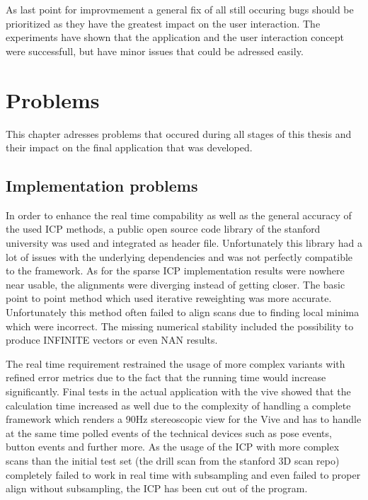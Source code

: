 \documentclass[hyperref,english,bachelorofscience,bibnum,twoside]{cgvpub}
\begin{document}
As last point for improvmement a general fix of all still occuring bugs should be prioritized as they have the greatest impact on the user interaction.
The experiments have shown that the application and the user interaction concept were successfull, but have minor issues that could be adressed easily.

\chapter{Problems}

This chapter adresses problems that occured during all stages of this thesis and their impact on the final application that was developed.

\section{Implementation problems} \label{ch:Problems}

In order to enhance the real time compability as well as the general accuracy of the used ICP methods, a public open source code library of the stanford university was used and integrated as header file. Unfortunately this library had a lot of issues with the underlying dependencies and was not perfectly compatible to the framework. As for the sparse ICP implementation results were nowhere near usable, the alignments were diverging instead of getting closer. The basic point to point method which used iterative reweighting
was more accurate. Unfortunately this method often failed to align scans due to finding local minima which were incorrect. The missing numerical stability included the possibility to produce INFINITE vectors or even NAN results.

The real time requirement restrained the usage of more complex variants with refined error metrics due to the fact that the running time would increase significantly. Final tests in the actual application with the vive showed that the calculation time increased as well due to the complexity of handling a complete framework which renders a 90Hz stereoscopic view for the Vive and has to handle at the same time polled events of the technical devices such as pose events, button events and further more. As the usage of the ICP with more complex scans than the initial test set (the drill scan from the stanford 3D scan repo) completely failed to work in real time with subsampling and even failed to proper align without subsampling, the ICP has been cut out of the program.
\end{document}
